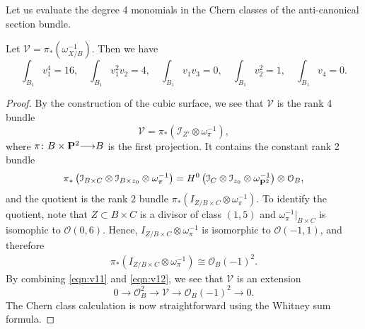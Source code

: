 \documentclass[12pt,reqno]{amsart}
\renewcommand{\to}{{\longrightarrow}}
\numberwithin{equation}{section}
\renewcommand{\O}{\mathcal O}
\begin{document}
Let us evaluate the degree 4 monomials in the Chern classes of the anti-canonical section bundle.
\begin{proposition}\label{lem:v1}
  Let $\mathcal V = \pi_* \left( \omega_{X/B}^{-1} \right)$.
  Then we have
  \[
    \int_{B_{1}}v_{1}^{4} = 16, \quad \int_{B_{1}}v_{1}^{2}v_{2} = 4,\quad \int_{B_{1}}v_{1}v_{3} =0,\quad \int_{B_{1}}v_2^{2} = 1,\quad \int_{B_{1}}v_{4} = 0.\]
\end{proposition}
\begin{proof}
By the construction of the cubic surface, we see that $\mathcal V$ is the rank 4 bundle
\[ \mathcal V = \pi_* (\mathcal I_{Z'} \otimes \omega_{\pi}^{-1}),\]
where $\pi \colon B \times \P^2 \to B$ is the first projection.
It contains the constant rank 2 bundle
\begin{equation}\label{eqn:v11}
  \pi_*\left( \mathcal I_{B \times C} \otimes \mathcal I_{B \times z_0} \otimes \omega_\pi^{-1} \right) = H^0\left(\mathcal I_{C} \otimes \mathcal I_{z_0} \otimes \omega_{\P^2}^{-1}\right) \otimes \O_{B},
\end{equation}
and the quotient is the rank 2 bundle $\pi_*\left( I_{Z/B \times C} \otimes \omega_\pi^{-1} \right)$.
To identify the quotient, note that $Z \subset B \times C$ is a divisor of class $(1,5)$ and $\omega^{-1}_{\pi}|_{B\times C}$ is isomophic to $\O(0,6)$.
Hence, $I_{Z/B \times C} \otimes \omega_\pi^{-1}$ is isomorphic to $\O(-1,1)$, and therefore
\begin{equation}\label{eqn:v12}
  \begin{split}
    \pi_*\left( I_{Z/B \times C} \otimes \omega_\pi^{-1} \right) \cong \O_{B}(-1)^{2}.
  \end{split}
\end{equation}
By combining \eqref{eqn:v11} and \eqref{eqn:v12}, we see that $\mathcal V$ is an extension
\begin{equation}\label{eqn:V1}
  0 \to \O_{B}^2 \to \mathcal V \to \O_{B}(-1)^2 \to 0.
\end{equation}
The Chern class calculation is now straightforward using the Whitney sum formula.
\end{proof}
\end{document}
